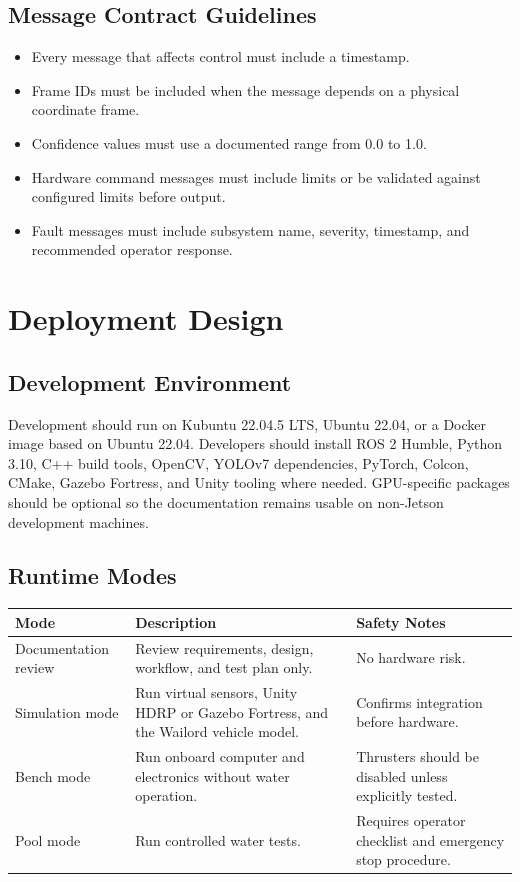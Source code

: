 \documentclass[12pt]{article}
\begin{document}
\subsection{Message Contract Guidelines}
\begin{itemize}[leftmargin=*]
  \item Every message that affects control must include a timestamp.
  \item Frame IDs must be included when the message depends on a physical coordinate frame.
  \item Confidence values must use a documented range from 0.0 to 1.0.
  \item Hardware command messages must include limits or be validated against configured limits before output.
  \item Fault messages must include subsystem name, severity, timestamp, and recommended operator response.
\end{itemize}

\section{Deployment Design}
\subsection{Development Environment}
Development should run on Kubuntu 22.04.5 LTS, Ubuntu 22.04, or a Docker image based on Ubuntu 22.04. Developers should install ROS 2 Humble, Python 3.10, C++ build tools, OpenCV, YOLOv7 dependencies, PyTorch, Colcon, CMake, Gazebo Fortress, and Unity tooling where needed. GPU-specific packages should be optional so the documentation remains usable on non-Jetson development machines.

\subsection{Runtime Modes}
\begin{longtable}{|p{}|p{}|p{}|}
\hline
\textbf{Mode} & \textbf{Description} & \textbf{Safety Notes} \\
\hline
Documentation review & Review requirements, design, workflow, and test plan only. & No hardware risk. \\
\hline
Simulation mode & Run virtual sensors, Unity HDRP or Gazebo Fortress, and the Wailord vehicle model. & Confirms integration before hardware. \\
\hline
Bench mode & Run onboard computer and electronics without water operation. & Thrusters should be disabled unless explicitly tested. \\
\hline
Pool mode & Run controlled water tests. & Requires operator checklist and emergency stop procedure. \\
\hline
\end{longtable}
\end{document}
